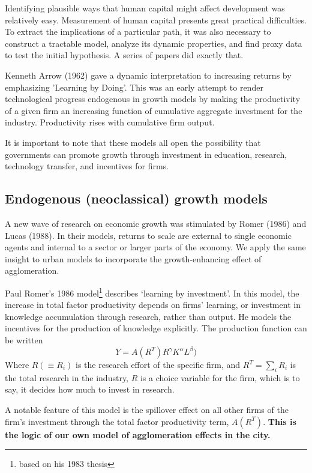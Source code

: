 Identifying  plausible ways that human capital might affect development was relatively easy. Measurement of human capital presents great practical difficulties. To extract the implications of a particular path, it was also necessary to construct a tractable model, analyze its dynamic properties, and find proxy data to test the initial hypothesis.   A series of papers did exactly that.

Kenneth Arrow (1962) gave a dynamic interpretation to increasing returns by emphasizing 'Learning by Doing'. This was an early attempt to render technological progress endogenous in growth models by making the productivity of a given firm an increasing function of cumulative aggregate investment for the industry. Productivity rises with cumulative firm output.


 It is important to note that these models all open the possibility that governments can  promote growth through investment in education, research, technology transfer, and incentives for firms.

\subsection{Endogenous (neoclassical) growth models}
A new wave of research on economic growth was stimulated by Romer (1986) and Lucas (1988). In their models, returns to scale are external to single economic agents and internal to a sector or larger parts of the economy. We apply the same insight to urban models to incorporate the growth-enhancing effect of agglomeration. 


Paul Romer's 1986  model\footnote{ based on his 1983 thesis} describes `learning by investment'. In this model, the increase in {total factor productivity} depends on firms’ learning, or investment in knowledge accumulation through research, rather than output. He models the incentives for the production of knowledge explicitly. The production function  can be written
\[Y = A(R^T)R^\gamma  K^\alpha L^\beta) \]
Where $R(\equiv R_i)$ is the research effort of the specific firm, and $R^T=\sum_iR_i$ is the total research in the industry,  $R$ is a choice variable for the firm, which is to say, it decides how much to invest in research. 

A notable feature of this model is the spillover effect on all other firms of the firm's investment through the \gls{total factor productivity} term,  $A(R^T)$. \textbf{This is the logic of our own model of agglomeration effects in the city.}

